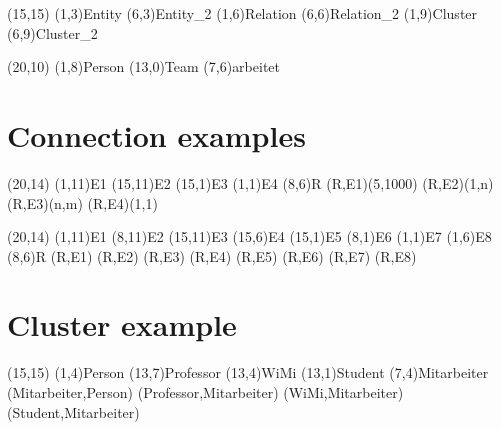 \documentclass[a4paper,11pt]{article}
\begin{document}
\setlength{\unitlength}{.6cm}
\begin{schema}(15,15)
  \entity(1,3){Entity}
  \entity*(6,3){Entity\_2}
  \relation(1,6){Relation}
  \relation*(6,6){Relation\_2}
  \cluster(1,9){Cluster}
  \cluster*(6,9){Cluster\_2}
\end{schema}

\begin{schema}(20,10)
  \entity(1,8){Person}
  \entity(13,0){Team}
  \relation(7,6){arbeitet}
\end{schema}

\section{Connection examples}

\begin{schema}(20,14)
  \entity(1,11){E1}
  \entity(15,11){E2}
  \entity(15,1){E3}
  \entity(1,1){E4}
  \relation(8,6){R}
  \connection(R,E1){(5,1000)}
  \connection(R,E2){(1,n)}
  \connection(R,E3){(n,m)}
  \connection(R,E4){(1,1)}
\end{schema}

\begin{schema}(20,14)
  \entity(1,11){E1}
  \entity(8,11){E2}
  \entity(15,11){E3}
  \entity(15,6){E4}
  \entity(15,1){E5}
  \entity(8,1){E6}
  \entity(1,1){E7}
  \entity(1,6){E8}
  \relation(8,6){R}
  \connection(R,E1){}
  \connection(R,E2){}
  \connection(R,E3){}
  \connection(R,E4){}
  \connection(R,E5){}
  \connection(R,E6){}
  \connection(R,E7){}
  \connection(R,E8){}
\end{schema}

\section{Cluster example}

\begin{schema}(15,15)
  \entity(1,4){Person}
  \relation(13,7){Professor}
  \relation(13,4){WiMi}
  \relation(13,1){Student}
  \cluster(7,4){Mitarbeiter}
  \connection(Mitarbeiter,Person){}
  \connection(Professor,Mitarbeiter){}
  \connection(WiMi,Mitarbeiter){}
  \connection(Student,Mitarbeiter){}
\end{schema}
\end{document}
